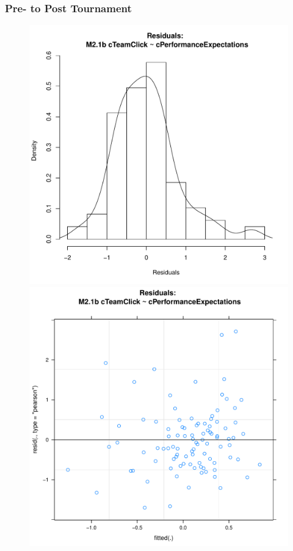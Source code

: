 { \subsubsection{Pre- to Post Tournament\label{app8:MLM21b}}

 
 



 \begin{figure}[htbp]
   \includegraphics[scale =.4]{images/MLM21bHist.pdf}
   \includegraphics[scale =.4]{images/MLM21bScatter.pdf}

\end{figure}}
